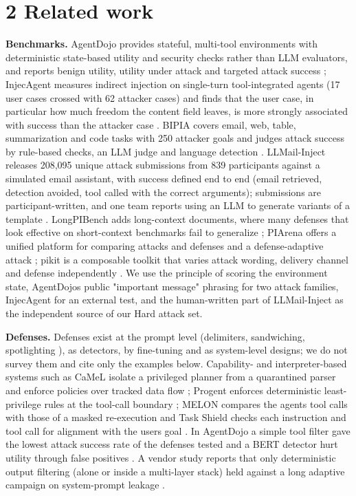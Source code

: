 \documentclass[10pt]{article}
\begin{document}
\section{2 Related work}

\textbf{Benchmarks.} AgentDojo provides stateful, multi-tool environments with deterministic state-based utility and security checks rather than LLM evaluators, and reports benign utility, utility under attack and targeted attack success \cite{arxiv2406_13352}; InjecAgent measures indirect injection on single-turn tool-integrated agents (17 user cases crossed with 62 attacker cases) and finds that the user case, in particular how much freedom the content field leaves, is more strongly associated with success than the attacker case \cite{arxiv2403_02691}. BIPIA covers email, web, table, summarization and code tasks with 250 attacker goals and judges attack success by rule-based checks, an LLM judge and language detection \cite{arxiv2312_14197}. LLMail-Inject releases 208,095 unique attack submissions from 839 participants against a simulated email assistant, with success defined end to end (email retrieved, detection avoided, tool called with the correct arguments); submissions are participant-written, and one team reports using an LLM to generate variants of a template \cite{arxiv2506_09956}. LongPIBench adds long-context documents, where many defenses that look effective on short-context benchmarks fail to generalize \cite{arxiv2608_28411}; PIArena offers a unified platform for comparing attacks and defenses and a defense-adaptive attack \cite{arxiv2604_08499}; pikit is a composable toolkit that varies attack wording, delivery channel and defense independently \cite{arxiv2609_36817}. We use the principle of scoring the environment state, AgentDojo\textquotesingle s public "important message" phrasing for two attack families, InjecAgent for an external test, and the human-written part of LLMail-Inject as the independent source of our Hard attack set.

\textbf{Defenses.} Defenses exist at the prompt level (delimiters, sandwiching, spotlighting \cite{arxiv2403_14720}), as detectors, by fine-tuning and as system-level designs; we do not survey them and cite only the examples below. Capability- and interpreter-based systems such as CaMeL isolate a privileged planner from a quarantined parser and enforce policies over tracked data flow \cite{arxiv2503_18813}; Progent enforces deterministic least-privilege rules at the tool-call boundary \cite{arxiv2504_11703}; MELON compares the agent\textquotesingle s tool calls with those of a masked re-execution and Task Shield checks each instruction and tool call for alignment with the user\textquotesingle s goal \cite{arxiv2502_05174,arxiv2412_16682}. In AgentDojo a simple tool filter gave the lowest attack success rate of the defenses tested and a BERT detector hurt utility through false positives \cite{arxiv2406_13352}. A vendor study reports that only deterministic output filtering (alone or inside a multi-layer stack) held against a long adaptive campaign on system-prompt leakage \cite{arxiv2604_23887}.
\end{document}
